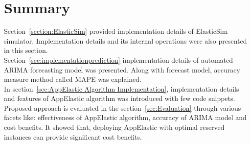 \section{Summary}
\label{sec:Summary}
Section~\ref{section:ElasticSim} provided implementation details of ElasticSim simulator. Implementation details and its internal operations were also presented in this section.
\\
Section~\ref{sec:implementationprediction} implementation details of automated ARIMA forecasting model was presented. Along with forecast model, accuracy measure method called MAPE was explained.
\\
In section~\ref{sec:AppElastic Algorithm Implementation}, implementation details and features of AppElastic algorithm was introduced with few code snippets. Proposed approach is evaluated in the section~\ref{sec:Evaluation} through various facets like: effectiveness of AppElastic algorithm, accuracy of ARIMA model and cost benefits. It showed that, deploying AppElastic with optimal reserved instances can provide significant cost benefits.

